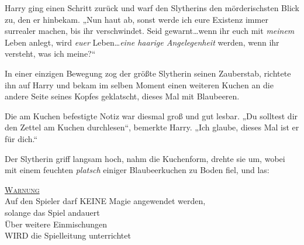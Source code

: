 Harry ging einen Schritt zurück und warf den Slytherins den mörderischsten Blick zu, den er hinbekam. „Nun haut ab, sonst werde ich eure Existenz immer surrealer machen, bis ihr verschwindet. Seid gewarnt…wenn ihr euch mit \emph{meinem} Leben anlegt, wird \emph{euer} Leben…\emph{eine haarige Angelegenheit} werden, wenn ihr versteht, was ich meine?“

In einer einzigen Bewegung zog der größte Slytherin seinen Zauberstab, richtete ihn auf Harry und bekam im selben Moment einen weiteren Kuchen an die andere Seite seines Kopfes geklatscht, dieses Mal mit Blaubeeren.

Die am Kuchen befestigte Notiz war diesmal groß und gut lesbar. „Du solltest dir den Zettel am Kuchen durchlesen“, bemerkte Harry. „Ich glaube, dieses Mal ist er für dich.“

Der Slytherin griff langsam hoch, nahm die Kuchenform, drehte sie um, wobei mit einem feuchten \emph{platsch} einiger Blaubeerkuchen zu Boden fiel, und las:
\begin{writtenNote}\centering
\textsc{\underline{Warnung}}\\
Auf den Spieler darf \MakeUppercase{keine} Magie angewendet werden,\\
solange das Spiel andauert\\
Über weitere Einmischungen\\
\MakeUppercase{wird} die Spielleitung unterrichtet
\end{writtenNote}

